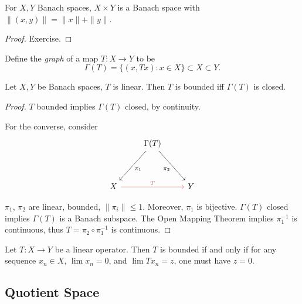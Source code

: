 \begin{proposition}
	\label{prop:CartesianProductBanachSpace}
	
	For $X, Y$ Banach spaces, $X \times Y$ is a Banach space with $\|(x, y)\| = \|x\| + \|y\|$.
\end{proposition}
\begin{proof}
	Exercise.
\end{proof}

Define the \textit{graph} of a map $T: X \to Y$ to be
\[
	\Gamma(T) = \{(x, T x): x\in X\} \subset X \subset Y
.\] 

\begin{theorem}
	\label{thm:ClosedGraphThm}
	Let $X, Y$ be Banach spaces,  $T$ is linear. Then $T$ is bounded iff $\Gamma(T)$ is closed.
\end{theorem}
\begin{proof}
	$T$ bounded implies $\Gamma(T)$ closed, by continuity.

	For the converse, consider
\[\begin{tikzcd}
	& {\Gamma(T)} \\
	\\
	X && Y
	\arrow["{\pi_1}", from=1-2, to=3-1]
	\arrow["{\pi_2}"', from=1-2, to=3-3]
	\arrow["T", color={rgb,255:red,214;green,92;blue,92}, from=3-1, to=3-3]
\end{tikzcd}\]

$\pi_1$, $\pi_2$ are linear, bounded, $\|\pi_i\| \le  1$. Moreover, $\pi_1$ is bijective. $\Gamma(T)$ closed implies  $\Gamma(T)$ is a Banach subspace. The Open Mapping Theorem implies $\pi_1^{-1}$ is continuous, thus $T = \pi_2 \circ \pi_1^{-1}$ is continuous.
\end{proof}

\begin{corollary}
	\label{cor:BoundedOperatorSequence}
	Let $T : X \to Y$ be a linear operator. Then $T$ is bounded if and only if for any sequence $x_n \in X$, $\lim x_n = 0$, and $\lim T x_n = z$, one must have $z =0$.
\end{corollary}

\subsection{Quotient Space}



